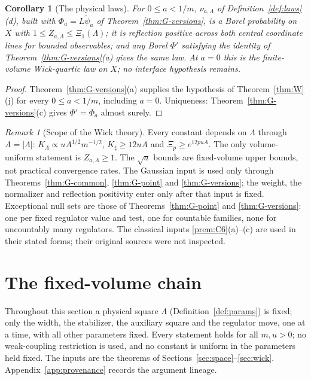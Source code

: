 \documentclass[11pt]{article}
\theoremstyle{plain}
\newtheorem{corollary}[theorem]{Corollary}
\theoremstyle{definition}
\theoremstyle{remark}
\newtheorem{remark}[theorem]{Remark}
\begin{document}
\begin{corollary}[The physical laws]\label{cor:W-laws}
For $0\le a<1/m$, $\nu_{a,\Lambda}$ of Definition~\ref{def:laws}(d), built with
$\Phi_a=L\tilde\psi_a$ of Theorem~\ref{thm:G-versions}, is a Borel probability on $X$
with $1\le Z_{a,\Lambda}\le\Xi_1(\Lambda)$; it is reflection positive across both central
coordinate lines for bounded observables; and any Borel $\Phi'$ satisfying the
identity of Theorem~\ref{thm:G-versions}(a) gives the same law. At $a=0$ this is
the finite-volume Wick-quartic law on $X$; no interface hypothesis remains.
\end{corollary}

\begin{proof}
Theorem~\ref{thm:G-versions}(a) supplies the hypothesis of Theorem~\ref{thm:W}(j)
for every $0\le a<1/m$, including $a=0$. Uniqueness: Theorem~\ref{thm:G-versions}(c)
gives $\Phi'=\Phi_a$ almost surely.
\end{proof}

\begin{remark}[Scope of the Wick theory]\label{rem:W-scope}
Every constant depends on $\Lambda$ through $A=|\Lambda|$: $K_\Lambda\propto uA^{1/2}m^{-1/2}$,
$K_\sharp\ge12uA$ and $\Xi_p\ge e^{12puA}$. The only volume-uniform statement is
$Z_{a,\Lambda}\ge1$. The $\sqrt a$ bounds are fixed-volume upper bounds, not practical
convergence rates. The Gaussian input is used only through
Theorems~\ref{thm:G-common}, \ref{thm:G-point} and \ref{thm:G-versions}; the weight,
the normalizer and reflection positivity enter only after that input is fixed.
Exceptional null sets are those of Theorems~\ref{thm:G-point} and
\ref{thm:G-versions}: one per fixed regulator value and test, one for countable
families, none for uncountably many regulators. The classical inputs
\ref{prem:C6}(a)--(c) are used in their stated forms; their original sources were
not inspected.
\end{remark}

\section{The fixed-volume chain}\label{sec:fixed}

Throughout this section a physical square $\Lambda$ (Definition~\ref{def:params}) is
fixed; only the width, the stabilizer, the auxiliary square and the regulator
move, one at a time, with all other parameters fixed. Every statement holds for
all $m,u>0$; no weak-coupling restriction is used, and no constant is uniform in
the parameters held fixed. The inputs are the theorems of
Sections~\ref{sec:space}--\ref{sec:wick}. Appendix~\ref{app:provenance} records the argument lineage.
\end{document}
